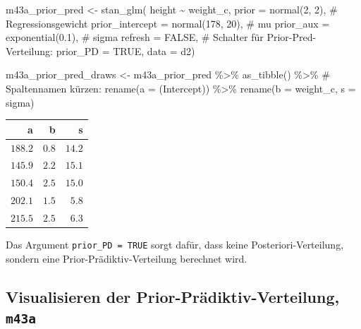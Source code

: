 \documentclass[
  a4paper,
  DIV=11]{scrreprt}
\newenvironment{Shaded}{\begin{snugshade}}{\end{snugshade}}
\newcommand{\AttributeTok}[1]{\textcolor[rgb]{0.40,0.45,0.13}{#1}}
\newcommand{\CommentTok}[1]{\textcolor[rgb]{0.37,0.37,0.37}{#1}}
\newcommand{\ConstantTok}[1]{\textcolor[rgb]{0.56,0.35,0.01}{#1}}
\newcommand{\DecValTok}[1]{\textcolor[rgb]{0.68,0.00,0.00}{#1}}
\newcommand{\FloatTok}[1]{\textcolor[rgb]{0.68,0.00,0.00}{#1}}
\newcommand{\FunctionTok}[1]{\textcolor[rgb]{0.28,0.35,0.67}{#1}}
\newcommand{\NormalTok}[1]{\textcolor[rgb]{0.00,0.23,0.31}{#1}}
\newcommand{\OtherTok}[1]{\textcolor[rgb]{0.00,0.23,0.31}{#1}}
\newcommand{\SpecialCharTok}[1]{\textcolor[rgb]{0.37,0.37,0.37}{#1}}
\newcommand{\StringTok}[1]{\textcolor[rgb]{0.13,0.47,0.30}{#1}}
\theoremstyle{definition}
\theoremstyle{remark}
\begin{document}
\begin{Shaded}
\begin{Highlighting}[]
\NormalTok{m43a\_prior\_pred }\OtherTok{\textless{}{-}}
    \FunctionTok{stan\_glm}\NormalTok{(}
\NormalTok{      height }\SpecialCharTok{\textasciitilde{}}\NormalTok{ weight\_c, }
      \AttributeTok{prior =} \FunctionTok{normal}\NormalTok{(}\DecValTok{2}\NormalTok{, }\DecValTok{2}\NormalTok{),  }\CommentTok{\# Regressionsgewicht}
      \AttributeTok{prior\_intercept =} \FunctionTok{normal}\NormalTok{(}\DecValTok{178}\NormalTok{, }\DecValTok{20}\NormalTok{),  }\CommentTok{\# mu}
      \AttributeTok{prior\_aux =} \FunctionTok{exponential}\NormalTok{(}\FloatTok{0.1}\NormalTok{),  }\CommentTok{\# sigma}
      \AttributeTok{refresh =} \ConstantTok{FALSE}\NormalTok{, }
      \CommentTok{\# Schalter für Prior{-}Pred{-}Verteilung:}
      \AttributeTok{prior\_PD =} \ConstantTok{TRUE}\NormalTok{, }
      \AttributeTok{data =}\NormalTok{ d2)}


\NormalTok{m43a\_prior\_pred\_draws }\OtherTok{\textless{}{-}} 
\NormalTok{  m43a\_prior\_pred }\SpecialCharTok{\%\textgreater{}\%} 
  \FunctionTok{as\_tibble}\NormalTok{() }\SpecialCharTok{\%\textgreater{}\%} 
  \CommentTok{\# Spaltennamen kürzen: }
  \FunctionTok{rename}\NormalTok{(}\AttributeTok{a =} \StringTok{\textasciigrave{}}\AttributeTok{(Intercept)}\StringTok{\textasciigrave{}}\NormalTok{) }\SpecialCharTok{\%\textgreater{}\%}  
  \FunctionTok{rename}\NormalTok{(}\AttributeTok{b =}\NormalTok{ weight\_c,}
         \AttributeTok{s =}\NormalTok{ sigma)}
\end{Highlighting}
\end{Shaded}

\begin{longtable}{rrr}
\toprule
a & b & s \\ 
\midrule
$188.2$ & $0.8$ & $14.2$ \\ 
$145.9$ & $2.2$ & $15.1$ \\ 
$150.4$ & $2.5$ & $15.0$ \\ 
$202.1$ & $1.5$ & $5.8$ \\ 
$215.5$ & $2.5$ & $6.3$ \\ 
\bottomrule
\end{longtable}

Das Argument \texttt{prior\_PD\ =\ TRUE} sorgt dafür, dass keine
Posteriori-Verteilung, sondern eine Prior-Prädiktiv-Verteilung berechnet
wird.

\hypertarget{visualisieren-der-prior-pruxe4diktiv-verteilung-m43a}{%
\subsection{\texorpdfstring{Visualisieren der
Prior-Prädiktiv-Verteilung,
\texttt{m43a}}{Visualisieren der Prior-Prädiktiv-Verteilung, m43a}}\label{visualisieren-der-prior-pruxe4diktiv-verteilung-m43a}}
\end{document}

